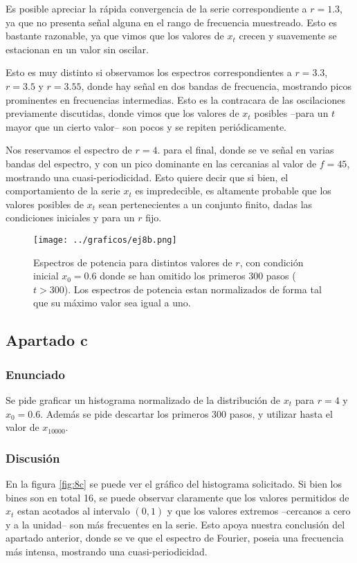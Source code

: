 \documentclass[a4paper,10pt]{paper}
\begin{document}
Es posible apreciar la r\'apida convergencia de la serie correspondiente a $r=1.3$, ya que no presenta 
se\~nal alguna en el rango de frecuencia muestreado. Esto es bastante razonable, ya que vimos que los 
valores de $x_t$ crecen y suavemente se estacionan en un valor sin oscilar.

Esto es muy distinto si observamos los espectros correspondientes a $r=3.3$, $r=3.5$ y $r=3.55$, donde hay
se\~nal en dos bandas de frecuencia, mostrando picos prominentes en frecuencias intermedias. Esto es la contracara
de las oscilaciones previamente discutidas, donde vimos que los valores de $x_t$ posibles --para un $t$ mayor que
un cierto valor-- son pocos y se repiten peri\'odicamente. 

Nos reservamos el espectro de $r=4.$ para el final, donde se ve se\~nal en varias bandas del espectro, y con un pico 
dominante en las cercanias al valor de $f=45$, mostrando una cuasi-periodicidad. Esto quiere decir que si bien, 
el comportamiento de la serie $x_t$ es impredecible, es altamente probable que los valores posibles de $x_t$ sean 
pertenecientes a un conjunto finito, dadas las condiciones iniciales y para un $r$ fijo.

\begin{figure}[!h]
 \centering
 \texttt{[image: ../graficos/ej8b.png]}
  \caption{Espectros de potencia para distintos valores de $r$, con condici\'on inicial $x_0 = 0.6$ donde se han omitido
  los primeros 300 pasos ($t>300$). Los espectros de potencia estan normalizados de forma tal que su m\'aximo valor sea igual a uno.}
 \label{fig:ej8b}
\end{figure}

\subsection{Apartado c}
\subsubsection{Enunciado}
Se pide graficar un histograma normalizado de la distribuci\'on de $x_t$ para $r=4$ y $x_0=0.6$. Adem\'as se pide descartar los primeros
300 pasos, y utilizar hasta el valor de $x_{10000}$.

\subsubsection{Discusi\'on}
En la figura \ref{fig:8c} se puede ver el gr\'afico del histograma solicitado. Si bien los bines son en total 16, se puede observar claramente
que los valores permitidos de $x_t$ estan acotados al intervalo $(0, 1)$ y que los valores extremos --cercanos a cero y a la unidad-- son
m\'as frecuentes en la serie. Esto apoya nuestra conclusi\'on del apartado anterior, donde se ve que el espectro de Fourier, poseia 
una frecuencia m\'as intensa, mostrando una cuasi-periodicidad.
\end{document}
